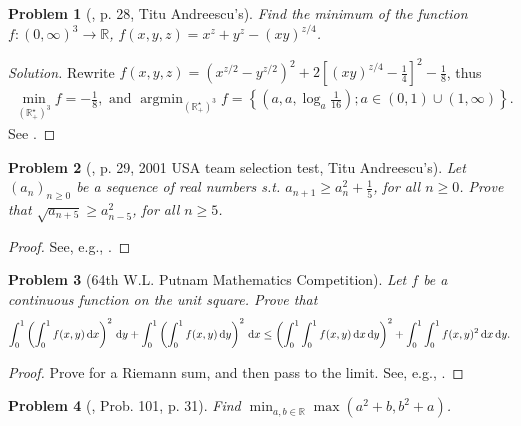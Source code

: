 \documentclass[oneside]{book}
\numberwithin{equation}{section}
\newtheorem{problem}{Problem}[section]
\begin{document}
\begin{problem}[\cite{Gelca_Andreescu2017}, p. 28, Titu Andreescu's]
	Find the minimum of the function $f:(0,\infty)^3\to\mathbb{R}$, $f(x,y,z) = x^z + y^z - (xy)^{z/4}$.
\end{problem}

\begin{proof}[Solution]
	Rewrite $f(x,y,z) = \left(x^{z/2} - y^{z/2}\right)^2 + 2\left[(xy)^{z/4} - \frac{1}{4}\right]^2 - \frac{1}{8}$, thus
	\begin{align*}
		\min_{(\mathbb{R}_+^\star)^3} f = -\frac{1}{8},\mbox{ and }\operatorname{argmin}_{(\mathbb{R}_+^\star)^3} f = \left\{\left(a,a,\log_a\frac{1}{16}\right);a\in(0,1)\cup(1,\infty)\right\}.
	\end{align*}
	See \cite[p. 29]{Gelca_Andreescu2017}.
\end{proof}

\begin{problem}[\cite{Gelca_Andreescu2017}, p. 29, 2001 USA team selection test, Titu Andreescu's]
	Let $(a_n)_{n\ge 0}$ be a sequence of real numbers s.t. $a_{n+1}\ge a_n^2 + \frac{1}{5}$, for all $n\ge 0$. Prove that $\sqrt{a_{n+5}}\ge a_{n-5}^2$, for all $n\ge 5$.
\end{problem}

\begin{proof}[Proof]
	See, e.g., \cite[p. 29]{Gelca_Andreescu2017}.
\end{proof}

\begin{problem}[64th W.L. Putnam Mathematics Competition]
	Let $f$ be a continuous function on the unit square. Prove that
	\begin{align*}
		\int_0^1 \left(\int_0^1 f(x,y)\,{\rm d}x\right)^2\,{\rm d}y + \int_0^1 \left(\int_0^1 f(x,y)\,{\rm d}y\right)^2\,{\rm d}x\le\left(\int_0^1\int_0^1 f(x,y)\,{\rm d}x\,{\rm d}y\right)^2 + \int_0^1\int_0^1 f(x,y)^2\,{\rm d}x\,{\rm d}y.
	\end{align*}
\end{problem}

\begin{proof}[Proof]
	Prove for a Riemann sum, and then pass to the limit. See, e.g., \cite[pp. 30--31]{Gelca_Andreescu2017}.
\end{proof}

\begin{problem}[\cite{Gelca_Andreescu2017}, Prob. 101, p. 31]
	Find $\min_{a,b\in\mathbb{R}}\max(a^2 + b,b^2 + a)$.
\end{problem}
\end{document}
